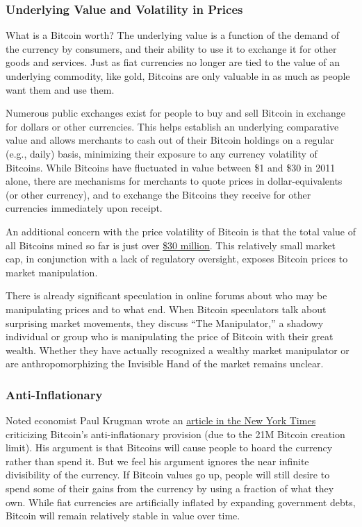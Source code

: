 \documentclass[12pt,twocolumn]{article}
\begin{document}
\subsubsection{Underlying Value and Volatility in Prices}

What is a Bitcoin worth? The underlying value is a function of the
demand of the currency by consumers, and their ability to use it to
exchange it for other goods and services. Just as fiat currencies no
longer are tied to the value of an underlying commodity, like gold,
Bitcoins are only valuable in as much as people want them and use them.

Numerous public exchanges exist for people to buy and sell Bitcoin in
exchange for dollars or other currencies. This helps establish an
underlying comparative value and allows merchants to cash out of their
Bitcoin holdings on a regular (e.g., daily) basis, minimizing their
exposure to any currency volatility of Bitcoins. While Bitcoins have
fluctuated in value between \$1 and \$30 in 2011 alone, there are
mechanisms for merchants to quote prices in dollar-equivalents (or other
currency), and to exchange the Bitcoins they receive for other
currencies immediately upon receipt.

An additional concern with the price volatility of Bitcoin is that the
total value of all Bitcoins mined so far is just over
\href{http://blockchain.info/stats}{\$30 million}. This relatively small
market cap, in conjunction with a lack of regulatory oversight, exposes
Bitcoin prices to market manipulation.

There is already significant speculation in online forums about who may
be manipulating prices and to what end. When Bitcoin speculators talk
about surprising market movements, they discuss ``The Manipulator,'' a
shadowy individual or group who is manipulating the price of Bitcoin
with their great wealth. Whether they have actually recognized a wealthy
market manipulator or are anthropomorphizing the Invisible Hand of the
market remains unclear.

\subsubsection{Anti-Inflationary}

Noted economist Paul Krugman wrote an
\href{http://krugman.blogs.nytimes.com/2011/09/07/golden-cyberfetters/}{article
in the New York Times} criticizing Bitcoin's anti-inflationary provision
(due to the 21M Bitcoin creation limit). His argument is that Bitcoins
will cause people to hoard the currency rather than spend it. But we
feel his argument ignores the near infinite divisibility of the
currency. If Bitcoin values go up, people will still desire to spend
some of their gains from the currency by using a fraction of what they
own. While fiat currencies are artificially inflated by expanding
government debts, Bitcoin will remain relatively stable in value over
time.
\end{document}
